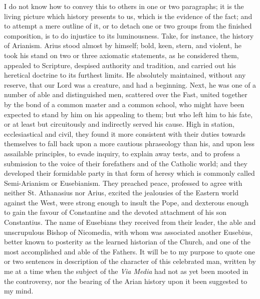 I do not know how to convey this to others in one or two
paragraphs; it is the living picture which history presents to us,
which is the evidence of the fact; and to attempt a mere outline of
it, or to detach one or two groups from the finished composition, is
to do injustice to its luminousness. Take, for instance, the history
of Arianism. Arius stood almost by himself; bold, keen, stern, and
violent, he took his stand on two or three axiomatic statements, as he
considered them, appealed to Scripture, despised authority and
tradition, and carried out his heretical doctrine to its furthest
limits. He absolutely maintained, without any reserve, that our Lord
was a creature, and had a beginning. Next, he was one of a number of
able and distinguished men, scattered over the Fast, united together
by the bond of a common master and a common school, who might have
been expected to stand by him on his appealing to them; but who left
him to his fate, or at least but circuitously and indirectly served
his cause. High in station, ecclesiastical and civil, they found it
more consistent with their duties towards themselves to fall back upon
a more cautious phraseology than his, and upon less assailable
principles, to evade inquiry, to explain away tests, and to profess a
submission to the voice of their forefathers and of the Catholic
world; and they developed their formidable party in that form of
heresy which is commonly called Semi-Arianism or Eusebianism. They
preached peace, professed to agree with neither St. Athanasius nor
Arius, excited the jealousies of the Eastern world against the West,
were strong enough to insult the Pope, and dexterous enough to gain
the favour of Constantine and the devoted attachment of his son
Constantius. The name of Eusebians they received from their leader,
the able and unscrupulous Bishop of Nicomedia, with whom was
associated another Eusebius, better known to posterity as the learned
historian of the Church, and one of the most accomplished and able of
the Fathers. It will be to my purpose to quote one or two sentences in
description of the character of this celebrated man, written by me at
a time when the subject of the \emph{Via Media} had not as yet been
mooted in the controversy, nor the bearing of the Arian history upon
it been suggested to my mind.

